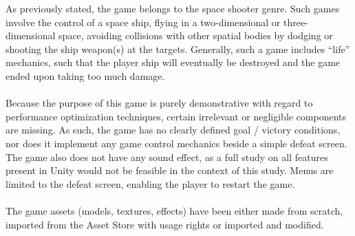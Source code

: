 As previously stated, the game belongs to the space shooter genre. Such games involve the control of a space ship, flying in a two-dimensional or three-dimensional space, avoiding collisions with other spatial bodies by dodging or shooting the ship weapon(s) at the targets. Generally, such a game includes ``life'' mechanics, such that the player ship will eventually be destroyed and the game ended upon taking too much damage. \\ \\
Because the purpose of this game is purely demonstrative with regard to performance optimization techniques, certain irrelevant or negligible components are missing. As such, the game has no clearly defined goal / victory conditions, nor does it implement any game control mechanics beside a simple defeat screen. The game also does not have any sound effect, as a full study on all features present in Unity would not be feasible in the context of this study. Menus are limited to the defeat screen, enabling the player to restart the game. \\ \\
The game assets (models, textures, effects) have been either made from scratch, imported from the Asset Store with usage rights or imported and modified.
